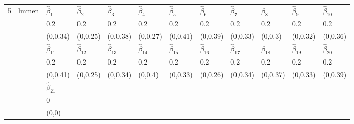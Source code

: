 \documentclass[varwidth, border={10 5 400 5}]{standalone}
\begin{document}
\begin{table}[ht]
\centering
\begin{tabular}{llllllllllll}
  \hline
  \hline
\multirow{9}{*}{5} & \multirow{9}{*}{lmmen} & $\hat{\beta}_{1}$ & $\hat{\beta}_{2}$ & $\hat{\beta}_{3}$ & $\hat{\beta}_{4}$ & $\hat{\beta}_{5}$ & $\hat{\beta}_{6}$ & $\hat{\beta}_{7}$ & $\hat{\beta}_{8}$ & $\hat{\beta}_{9}$ & $\hat{\beta}_{10}$ \\ 
   &  & 0.2 & 0.2 & 0.2 & 0.2 & 0.2 & 0.2 & 0.2 & 0.2 & 0.2 & 0.2 \\ 
   &  & (0,0.34) & (0,0.25) & (0,0.38) & (0,0.27) & (0,0.41) & (0,0.39) & (0,0.33) & (0,0.3) & (0,0.32) & (0,0.36) \\ 
   &  & $\hat{\beta}_{11}$ & $\hat{\beta}_{12}$ & $\hat{\beta}_{13}$ & $\hat{\beta}_{14}$ & $\hat{\beta}_{15}$ & $\hat{\beta}_{16}$ & $\hat{\beta}_{17}$ & $\hat{\beta}_{18}$ & $\hat{\beta}_{19}$ & $\hat{\beta}_{20}$ \\ 
   &  & 0.2 & 0.2 & 0.2 & 0.2 & 0.2 & 0.2 & 0.2 & 0.2 & 0.2 & 0.2 \\ 
   &  & (0,0.41) & (0,0.25) & (0,0.34) & (0,0.4) & (0,0.33) & (0,0.26) & (0,0.34) & (0,0.37) & (0,0.33) & (0,0.39) \\ 
   &  & $\hat{\beta}_{21}$ &  &  &  &  &  &  &  &  &  \\ 
   &  & 0 &  &  &  &  &  &  &  &  &  \\ 
   &  & (0,0) &  &  &  &  &  &  &  &  &  \\ 
   \hline
\end{tabular}
\end{table}
\end{document}
